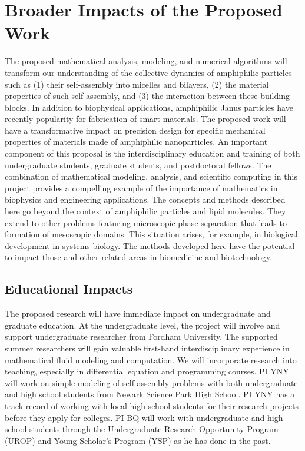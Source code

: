 \section{Broader Impacts of the Proposed Work}
\label{sec:BroaderImpacts}

The proposed mathematical analysis, modeling, and numerical algorithms
will transform our understanding of the collective dynamics of
amphiphilic particles such as (1) their self-assembly into micelles and
bilayers, (2) the material properties of such self-assembly, and (3) the
interaction between these building blocks. In addition to biophysical
applications, amphiphilic Janus particles have recently popularity for
fabrication of smart materials. The proposed work will have a
transformative impact on precision design for specific mechanical
properties of materials made of amphiphilic nanoparticles. An important
component of this proposal is the interdisciplinary education and
training of both undergraduate students, graduate students, and
postdoctoral fellows. The combination of mathematical modeling,
analysis, and scientific computing in this project provides a compelling
example of the importance of mathematics in biophysics and engineering
applications. The concepts and methods described here go beyond the
context of amphiphilic particles and lipid molecules. They extend to
other problems featuring microscopic phase separation that leads to
formation of mesoscopic domains. This situation arises, for example, in
biological development in systems biology. The methods developed here
have the potential to impact those and other related areas in
biomedicine and biotechnology.

\subsection{Educational Impacts}
\label{subsec:Educational_plans}
The proposed research will have immediate impact on undergraduate and
graduate education. At the undergraduate level, the project will involve
and support undergraduate researcher from Fordham University. The
supported summer researchers will gain valuable first-hand
interdisciplinary experience in mathematical fluid modeling and
computation. We will incorporate research into teaching, especially in
differential equation and programming courses. PI YNY will work on
simple modeling of self-assembly problems with both undergraduate and
high school students from Newark Science Park High School. PI YNY has a
track record of working with local high school students for their
research projects before they apply for colleges. PI BQ will work with
undergraduate and high school students through the Undergraduate
Research Opportunity Program (UROP) and Young Scholar's Program (YSP) as
he has done in the past.

